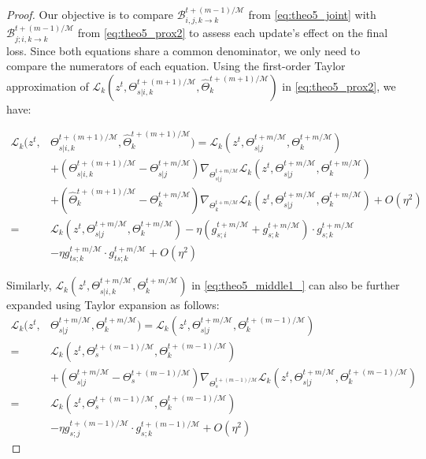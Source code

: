 \begin{proof}
Our objective is to compare $\mathcal{B}_{i,j,k \rightarrow k}^{t+(m-1)/\mathcal{M}}$ from \cref{eq:theo5_joint} with $\mathcal{B}_{j; i,k \rightarrow k}^{t+(m-1)/\mathcal{M}}$ from \cref{eq:theo5_prox2} to assess each update's effect on the final loss. Since both equations share a common denominator, we only need to compare the numerators of each equation. Using the first-order Taylor approximation of $\mathcal{L}_k(z^t, \Theta_{s|i,k}^{t+(m+1)/\mathcal{M}}, \hat{\Theta}_k^{t+(m+1)/\mathcal{M}})$ in \cref{eq:theo5_prox2}, we have:

\begin{align}
    \mathcal{L}_k(z^t, &\Theta_{s|i,k}^{t+(m+1)/\mathcal{M}}, \hat{\Theta}_k^{t+(m+1)/\mathcal{M}}) = \mathcal{L}_k (z^t, \Theta_{s|j}^{t+m/\mathcal{M}}, \Theta_k^{t+m/\mathcal{M}}) \label{eq:theo5_middle1_}\\
    &+(\Theta_{s|i,k}^{t+(m+1)/\mathcal{M}} - \Theta_{s|j}^{t+m/\mathcal{M}}) \nabla_{\Theta_{s|j}^{t+m/\mathcal{M}}} \mathcal{L}_k (z^t, \Theta_{s|j}^{t+m/\mathcal{M}}, \Theta_k^{t+m/\mathcal{M}})\\
    &+(\hat{\Theta}_k^{t+(m+1)/\mathcal{M}} - \Theta_k^{t+m/\mathcal{M}}) \nabla_{\Theta_k^{t+m/\mathcal{M}}} \mathcal{L}_k (z^t, \Theta_{s|j}^{t+m/\mathcal{M}}, \Theta_k^{t+m/\mathcal{M}}) + O(\eta^2)\\
    =& \mathcal{L}_k (z^t, \Theta_{s|j}^{t+m/\mathcal{M}}, \Theta_k^{t+m/\mathcal{M}}) - \eta (g_{s;i}^{t+m/\mathcal{M}}+g_{s;k}^{t+m/\mathcal{M}})\cdot g_{s;k}^{t+m/\mathcal{M}} \\
    &- \eta g_{ts;k}^{t+m/\mathcal{M}}\cdot g_{ts;k}^{t+m/\mathcal{M}} + O(\eta^2)
\end{align}

Similarly, $\mathcal{L}_k (z^t, \Theta_{s|i,k}^{t+m/\mathcal{M}}, \Theta_k^{t+m/\mathcal{M}})$ in \cref{eq:theo5_middle1_} can also be further expanded using Taylor expansion as follows:
\begin{align}
    \mathcal{L}_k(z^t, &\Theta_{s|j}^{t+m/\mathcal{M}}, \Theta_k^{t+m/\mathcal{M}}) = \mathcal{L}_k(z^t, \Theta_{s|j}^{t+m/\mathcal{M}}, \Theta_k^{t+(m-1)/\mathcal{M}}) \\
    =& \mathcal{L}_k (z^t, \Theta_s^{t+(m-1)/\mathcal{M}}, \Theta_k^{t+(m-1)/\mathcal{M}})\\
    &+(\Theta_{s|j}^{t+m/\mathcal{M}} - \Theta_s^{t+(m-1)/\mathcal{M}}) \nabla_{\Theta_s^{t+(m-1)/\mathcal{M}}} \mathcal{L}_k (z^t, \Theta_{s|j}^{t+m/\mathcal{M}}, \Theta_k^{t+(m-1)/\mathcal{M}}) \\
    =& \mathcal{L}_k (z^t, \Theta_s^{t+(m-1)/\mathcal{M}}, \Theta_k^{t+(m-1)/\mathcal{M}}) \label{eq:theo5_middle2_}\\
    &- \eta g_{s;j}^{t+(m-1)/\mathcal{M}}\cdot g_{s;k}^{t+(m-1)/\mathcal{M}}+ O(\eta^2)
    \label{eq:theo5_middle3_}
\end{align}


\end{proof}

